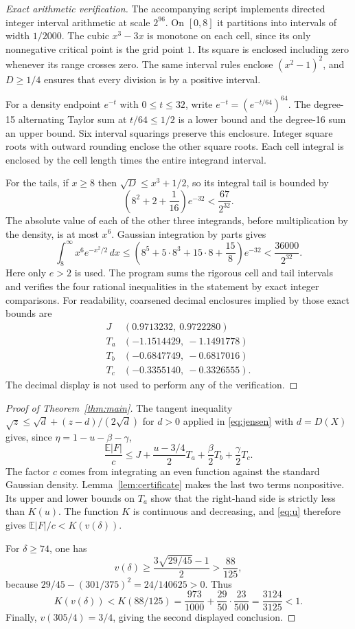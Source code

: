 \documentclass[11pt]{article}
\newcommand{\E}{\mathbb E}
\begin{document}
\begin{proof}[Exact arithmetic verification]
The accompanying script implements directed integer interval arithmetic at
scale $2^{96}$. On $[0,8]$ it partitions into intervals of width $1/2000$.
The cubic $x^3-3x$ is monotone on each cell, since its only nonnegative
critical point is the grid point $1$. Its square is enclosed including
zero whenever its range crosses zero. The same interval rules enclose
$(x^2-1)^2$, and $D\geq1/4$ ensures that every division is by a positive
interval.

For a density endpoint $e^{-t}$ with $0\leq t\leq32$, write
$e^{-t}=(e^{-t/64})^{64}$. The degree-15 alternating Taylor sum at
$t/64\leq1/2$ is a lower bound and the degree-16 sum an upper bound.
Six interval squarings preserve this enclosure. Integer square roots with
outward rounding enclose the other square roots. Each cell integral is
enclosed by the cell length times the entire integrand interval.

For the tails, if $x\geq8$ then $\sqrt D\leq x^3+1/2$, so its integral tail
is bounded by
\[
 \left(8^2+2+\frac1{16}\right)e^{-32}<\frac{67}{2^{32}}.
\]
The absolute value of each of the other three integrands, before multiplication
by the density, is at most $x^6$. Gaussian integration by parts gives
\[
 \int_8^\infty x^6e^{-x^2/2}\,dx
 \leq\left(8^5+5\cdot8^3+15\cdot8+\frac{15}{8}\right)e^{-32}
 <\frac{36000}{2^{32}}.
\]
Here only $e>2$ is used. The program sums the rigorous cell and tail intervals
and verifies the four rational inequalities in the statement by exact integer
comparisons. For readability, coarsened decimal enclosures implied by those
exact bounds are
\[
 \begin{array}{c|c}
 J &(0.9713232,\ 0.9722280)\\
 T_a&(-1.1514429,\ -1.1491778)\\
 T_b&(-0.6847749,\ -0.6817016)\\
 T_c&(-0.3355140,\ -0.3326555).
 \end{array}
\]
The decimal display is not used to perform any of the verification.
\end{proof}

\begin{proof}[Proof of Theorem~\ref{thm:main}]
The tangent inequality $\sqrt z\leq\sqrt d+(z-d)/(2\sqrt d)$ for $d>0$
applied in \eqref{eq:jensen} with $d=D(X)$ gives, since
$\eta=1-u-\beta-\gamma$,
\[
 \frac{\E|F|}{c}
 \leq J+\frac{u-3/4}{2}T_a+\frac\beta2T_b+\frac\gamma2T_c.
\]
The factor $c$ comes from integrating an even function against the standard
Gaussian density. Lemma~\ref{lem:certificate} makes the last two terms
nonpositive. Its upper and lower bounds on $T_a$ show that the right-hand
side is strictly less than $K(u)$. The function $K$ is continuous and
decreasing, and \eqref{eq:u} therefore gives
$\E|F|/c<K(v(\delta))$.

For $\delta\geq74$, one has
\[
 v(\delta)\geq\frac{3\sqrt{29/45}-1}{2}>\frac{88}{125},
\]
because $29/45-(301/375)^2=24/140625>0$.
Thus
\[
 K(v(\delta))<K(88/125)
 =\frac{973}{1000}+\frac{29}{50}\cdot\frac{23}{500}
 =\frac{3124}{3125}<1.
\]
Finally, $v(305/4)=3/4$, giving the second displayed conclusion.
\end{proof}
\end{document}
